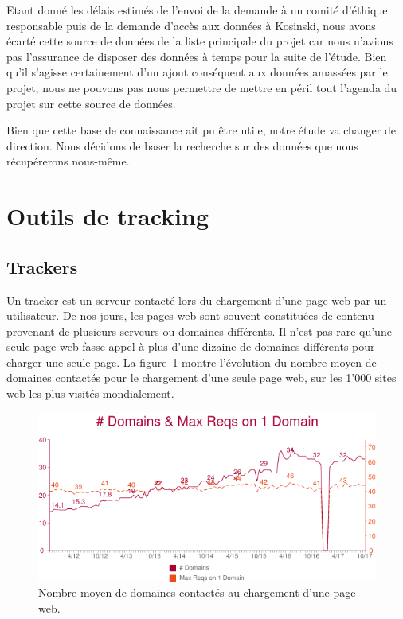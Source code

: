 		Etant donné les délais estimés de l'envoi de la demande à un comité d'éthique responsable puis de la demande d'accès aux données à Kosinski, nous avons écarté cette source de données de la liste principale du projet car nous n'avions pas l'assurance de disposer des données à temps pour la suite de l'étude. Bien qu'il s'agisse certainement d'un ajout conséquent aux données amassées par le projet, nous ne pouvons pas nous permettre de mettre en péril tout l'agenda du projet sur cette source de données.

		Bien que cette base de connaissance ait pu être utile, notre étude va changer de direction. Nous décidons de baser la recherche sur des données que nous récupérerons nous-même.

\section{Outils de tracking}

	\subsection{Trackers}

		Un tracker est un serveur contacté lors du chargement d'une page web par un utilisateur. De nos jours, les pages web sont souvent constituées de contenu provenant de plusieurs serveurs ou domaines différents. Il n'est pas rare qu'une seule page web fasse appel à plus d'une dizaine de domaines différents pour charger une seule page. La figure~\ref{a-nbdomains} montre l'évolution du nombre moyen de domaines contactés pour le chargement d'une seule page web, sur les 1'000 sites web les plus visités mondialement.

		\begin{figure}[h]
			\centering
			\includegraphics[width=1\textwidth]{images/analysis/nbdomains}
			\caption{Nombre moyen de domaines contactés au chargement d'une page web\cite{nbdomains}.}
			\label{a-nbdomains}
		\end{figure}

